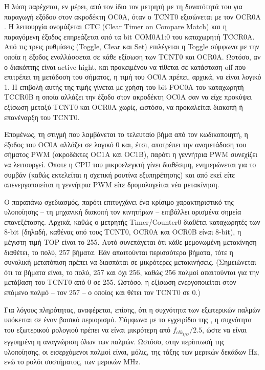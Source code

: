 Η λύση παρέχεται, εν μέρει, από τον ίδιο τον μετρητή με τη δυνατότητά του για
παραγωγή εξόδου στον ακροδέκτη OC0A, όταν ο TCNT0 εξισώνεται με τον OCR0A
\parencite[98--99,107]{atmel13}. Η λειτουργία ονομάζεται CTC (\textenglish{Clear
Timer on Compare Match}) και η παραγόμενη έξοδος επηρεάζεται από τα bit COM0A1:0
του καταχωρητή TCCR0A. Από τις τρεις ρυθμίσεις (\textenglish{Toggle, Clear} και
\textenglish{Set}) επιλέγεται η \textenglish{Toggle} σύμφωνα με την οποία η
έξοδος εναλλάσσεται σε κάθε εξίσωση των TCNT0 και OCR0A. Ωστόσο, αν ο διακόπτης
είναι \textenglish{active hight}, και προκειμένου να τίθεται σε κατάσταση
\textenglish{off} που επιτρέπει τη μετάδοση του σήματος, η τιμή του OC0A πρέπει,
αρχικά, να είναι λογικό 1. Η επιβολή αυτής της τιμής γίνεται με χρήση του bit
FOC0A του καταχωρητή TCCR0B η οποία αλλάζει την έξοδο στον ακροδέκτη OC0A σαν
να είχε προκύψει εξίσωση μεταξύ TCNT0 και OCR0A χωρίς, ωστόσο, να προκαλείται
διακοπή ή επανέναρξη του TCNT0.

Επομένως, τη στιγμή που λαμβάνεται το τελευταίο βήμα από τον κωδικοποιητή, η
έξοδος του OC0A αλλάζει σε λογικό 0 και, έτσι, αποτρέπει την αναμετάδοση του
σήματος PWM (ακροδέκτες OC1A και OC1B), παρότι η γεννήτρια PWM συνεχίζει να
λειτουργεί. Όποτε η CPU του μικροελεγκτή γίνει διαθέσιμη, ενημερώνεται για το
συμβάν (καθώς εκτελείται η σχετική ρουτίνα εξυπηρέτησης) και από εκεί είτε
απενεργοποιείται η γεννήτρια PWM είτε δρομολογείται νέα μετακίνηση.

%
%

Ο παραπάνω σχεδιασμός, παρότι επιτυγχάνει ένα κρίσιμο χαρακτηριστικό της
υλοποίησης -- τη μηχανική διακοπή τον κινητήρων -- επιβάλλει ορισμένα σημεία
επανεξέτασης. Αρχικά, καθώς ο μετρητής \textenglish{Timer\slash Counter0}
διαθέτει καταχωρητές των 8-bit (δηλαδή, καθένας από τους TCNT0, OCR0A και
OCR0B είναι 8-bit), η μέγιστη τιμή TOP είναι το 255. Αυτό συνεπάγεται ότι
κάθε μεμονωμένη μετακίνηση διαθέτει, το πολύ, 257 βήματα. Εάν απαιτούνται
περισσότερα βήματα, τότε η συνολική μετατόπιση πρέπει να διασπάται σε
μικρότερες μετακινήσεις. (Σημειώνεται ότι τα βήματα είναι, το πολύ, 257 και όχι
256, καθώς 256 παλμοί απαιτούνται για την μετάβαση του TCNT0 από 0 σε 255.
Ωστόσο, η εξίσωση ενεργοποιείται στον επόμενο παλμό -- τον 257 -- ο οποίος και
θέτει τον TCNT0 σε 0.)

Για λόγους πληρότητας, αναφέρεται, επίσης, ότι η συχνότητα των εξωτερικών παλμών
υπόκειται σε έναν βασικό περιορισμό. Σύμφωνα με το εγχειρίδιο της
\textcite[139--140]{atmel13}, η συχνότητα του εξωτερικού ρολογιού πρέπει να
είναι μικρότερη από $f_{clk_{I/O}}/2.5$, ώστε να είναι εγγυημένη η αναγνώριση
όλων των παλμών. Ωστόσο, στην περίπτωσή της υλοποίησης, οι εισερχόμενοι παλμοί
είναι, μόλις, της τάξης των μερικών δεκάδων Hz, ενώ το ρολόι συστήματος, των
μερικών MHz.

